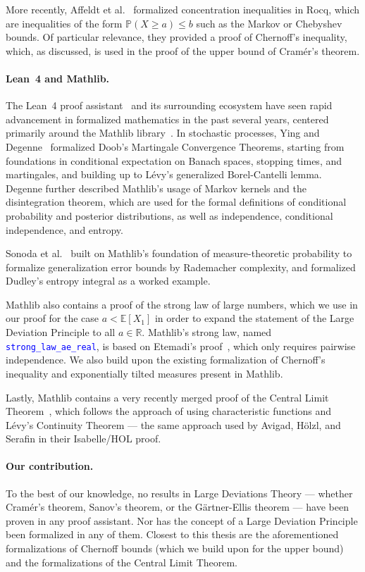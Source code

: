 \documentclass{article}
\newcommand{\leancode}[1]{\textcolor{blue}{\nolinkurl{#1}}}
\newcommand{\E}{\mathbb{E}}
\renewcommand{\P}{\mathbb{P}}
\newcommand{\R}{\mathbb{R}}
\begin{document}
More recently, Affeldt et al.\ \cite{affeldt2025concentration} formalized concentration
inequalities in Rocq, which are inequalities of the form $\P(X \ge a) \le b$ such as the Markov
or Chebyshev bounds. Of particular relevance, they provided a proof of Chernoff's inequality, which, as discussed, is used in the proof of the upper bound of Cram{\'e}r's theorem.

\paragraph{Lean~4 and Mathlib.}
The Lean~4 proof assistant~\cite{demoura2021lean4} and its surrounding ecosystem have seen rapid
advancement in formalized mathematics in the past several years, centered primarily around
the Mathlib library~\cite{mathlib2020}.
In stochastic processes, Ying and Degenne~\cite{ying2023martingale} formalized Doob's Martingale
Convergence Theorems, starting from foundations in conditional expectation on Banach spaces, stopping times, and martingales, and building up to L{\'e}vy's generalized
Borel-Cantelli lemma.
Degenne \cite{degenne2025kernels} further described Mathlib's usage of Markov kernels and the
disintegration theorem, which are used for the formal definitions of conditional probability
and posterior distributions, as well as independence, conditional independence, and entropy.

Sonoda et al.\ \cite{sonoda2025rademacher} built on Mathlib's foundation of measure-theoretic
probability to formalize generalization error bounds by Rademacher complexity, and formalized
Dudley's entropy integral as a worked example.

Mathlib also contains a proof of the strong law of large numbers, which we use in our proof for
the case $a < \E[X_1]$ in order to expand the statement of the Large Deviation Principle to all
$a \in \R$.
Mathlib's strong law, named \leancode{strong_law_ae_real}, is based on Etemadi's proof~\cite{etemadi1981slln}, which only requires pairwise independence. We also build upon the existing formalization of Chernoff's inequality and exponentially tilted measures present in Mathlib.

Lastly, Mathlib contains a very recently merged proof of the Central Limit Theorem~\cite{marion2026clt}, which follows the approach of using characteristic functions
and L{\'e}vy's Continuity Theorem --- the same approach used by Avigad, H{\"o}lzl, and Serafin
\cite{avigad2017clt} in their Isabelle/HOL proof.

\paragraph{Our contribution.}
To the best of our knowledge, no results in Large Deviations Theory --- whether Cram{\'e}r's theorem, Sanov's theorem, or the G{\"a}rtner-Ellis theorem --- have been proven in any proof
assistant. Nor has the concept of a Large Deviation Principle been formalized in any of them.
Closest to this thesis are the aforementioned formalizations of Chernoff bounds (which we build upon for the upper bound) and the formalizations of the Central Limit Theorem.
\end{document}

